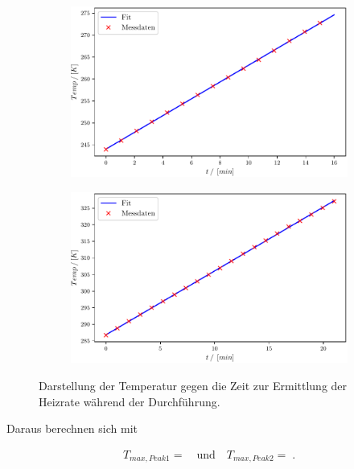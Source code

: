 \begin{figure}
\centering
\begin{subfigure}{.5\textwidth}
	\centering
	\includegraphics[width=1\textwidth]{build/1_Temp_Time_Peak1.pdf}
	\caption{}
	\label{fig:Auswertung_11}
\end{subfigure}%
\begin{subfigure}{.5\textwidth}
	\centering
	\includegraphics[width=1\textwidth]{build/1_Temp_Time_Peak2.pdf}
	\caption{}
	\label{fig:Auswertung_12}
\end{subfigure}
\caption{Darstellung der Temperatur gegen die Zeit zur Ermittlung der Heizrate während der Durchführung.}
\label{fig:Auswertung_11_12}
\end{figure}

Daraus berechnen sich mit

\begin{align}
	T_{max,Peak1} =   \quad \text{und} \quad T_{max,Peak2} = \;.
\end{align}


